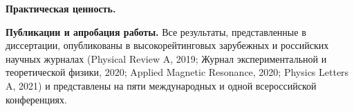 \textbf{Практическая ценность.}


\textbf{Публикации и апробация работы.}
Все результаты, представленные в диссертации,
опубликованы в высокорейтинговых зарубежных и российских научных журналах (Physical Review A, 2019;  Журнал экспериментальной и теоретической физики, 2020; Applied Magnetic Resonance, 2020; Physics Letters A, 2021) и представлены на пяти международных и одной всероссийской конференциях.



%

%
%





%
%
%
%

